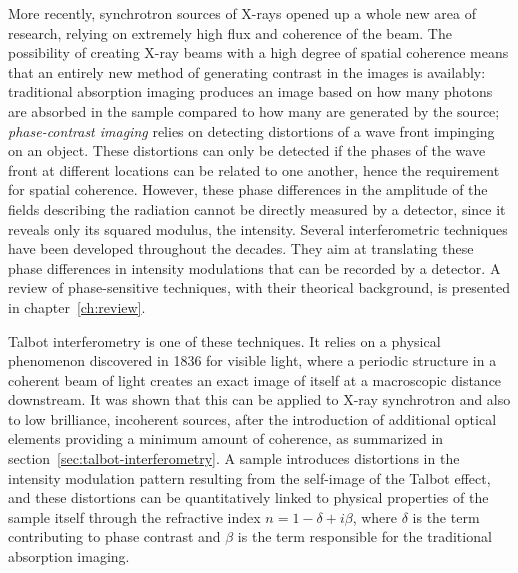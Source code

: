 More recently, synchrotron sources of X-rays opened up a whole new area of
research, relying on extremely high flux and coherence of the beam. The
possibility of creating X-ray beams with a high degree of spatial coherence
means that an entirely new method of generating contrast in the images is
availably: traditional absorption imaging produces an image based on how
many photons are absorbed in the sample compared to how many are generated
by the source; \emph{phase-contrast imaging} relies on detecting distortions
of a wave front impinging on an object. These distortions can only
be detected if the phases of the wave front at different locations can be
related to one another, hence the requirement for spatial coherence.
However, these phase differences in the amplitude of the fields describing
the radiation cannot be directly measured by a detector, since it reveals
only its squared modulus, the intensity. Several interferometric techniques
have been developed throughout the decades. They aim at translating these
phase differences in intensity modulations that can be recorded by a
detector. A review of phase-sensitive techniques, with their theorical
background, is presented in
chapter~\ref{ch:review}.

Talbot interferometry is one of these techniques. It relies on a physical
phenomenon discovered in 1836 for visible light, where a periodic structure
in a coherent beam of light creates an exact image of itself at a
macroscopic distance downstream. It was shown that this can be applied to
X-ray synchrotron and also to low brilliance, incoherent sources, after the
introduction of additional optical elements providing a minimum amount of
coherence, as summarized in section~\ref{sec:talbot-interferometry}.
A sample introduces distortions in the intensity modulation pattern
resulting from the self-image of the Talbot effect, and these distortions
can be quantitatively linked to physical properties of the sample itself
through the refractive index $n = 1 - \delta + i\beta$, where $\delta$ is
the term contributing to phase contrast and $\beta$ is the term responsible
for the traditional absorption imaging.

